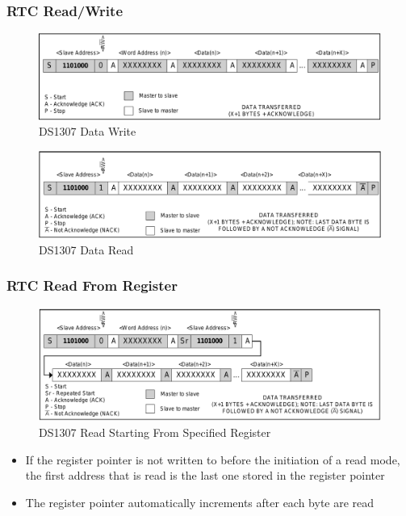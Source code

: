 \documentclass[aspectratio=169,usenames,dvipsnames]{beamer}
\begin{document}
\begin{frame}
  \frametitle{RTC Read/Write}
  \vspace*{-2mm}
  \begin{figure}
    \centering
    \includegraphics[scale=0.35]{images/ds1307-write.png}
    \caption{DS1307 Data Write}
  \end{figure}
  \vspace*{-5mm}
  \begin{figure}
    \centering
    \includegraphics[scale=0.35]{images/ds1307-read.png}
    \caption{DS1307 Data Read}
  \end{figure}
  \vspace*{-12mm}
\end{frame}

\begin{frame}
  \frametitle{RTC Read From Register}
  \begin{figure}
    \centering
    \includegraphics[scale=0.35]{images/ds1307-read-reg.png}
    \caption{DS1307 Read Starting From Specified Register}
  \end{figure}
  \vspace*{-5mm}
  \begin{itemize}
    \item If the register pointer is not written to before the initiation of a
          read mode, the first address that is read is the last one stored in
          the register pointer
    \item The register pointer automatically increments after each byte are read
  \end{itemize}
\end{frame}
\end{document}
